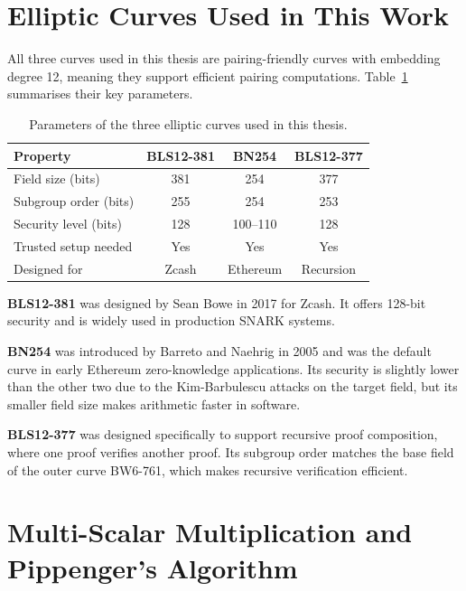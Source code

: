 \section{Elliptic Curves Used in This Work}
\label{sec:curves}
 
All three curves used in this thesis are pairing-friendly curves with
embedding degree 12, meaning they support efficient pairing
computations. Table~\ref{tab:curves} summarises their key parameters.
 
\begin{table}[h!]
\centering
\caption{Parameters of the three elliptic curves used in this thesis.}
\label{tab:curves}
\begin{tabular}{lccc}
\toprule
\textbf{Property} & \textbf{BLS12-381} & \textbf{BN254} & \textbf{BLS12-377} \\
\midrule
Field size (bits)     & 381  & 254      & 377  \\
Subgroup order (bits) & 255  & 254      & 253  \\
Security level (bits) & 128  & 100--110 & 128  \\
Trusted setup needed  & Yes  & Yes      & Yes  \\
Designed for          & Zcash & Ethereum & Recursion \\
\bottomrule
\end{tabular}
\end{table}
 
\textbf{BLS12-381} was designed by Sean Bowe in 2017 for Zcash. It
offers 128-bit security and is widely used in production SNARK
systems.
 
\textbf{BN254} was introduced by Barreto and Naehrig in 2005 and was
the default curve in early Ethereum zero-knowledge applications. Its
security is slightly lower than the other two due to the
Kim-Barbulescu attacks on the target field, but its smaller field
size makes arithmetic faster in software.
 
\textbf{BLS12-377} was designed specifically to support recursive
proof composition, where one proof verifies another proof. Its
subgroup order matches the base field of the outer curve BW6-761,
which makes recursive verification efficient.
 
\section{Multi-Scalar Multiplication and Pippenger's Algorithm}
\label{sec:msm-pippenger}

